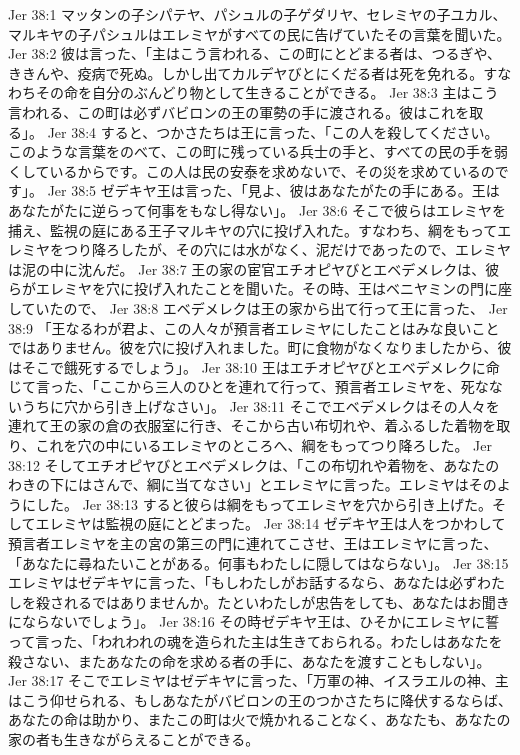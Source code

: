 Jer 38:1  マッタンの子シパテヤ、パシュルの子ゲダリヤ、セレミヤの子ユカル、マルキヤの子パシュルはエレミヤがすべての民に告げていたその言葉を聞いた。
Jer 38:2  彼は言った、「主はこう言われる、この町にとどまる者は、つるぎや、ききんや、疫病で死ぬ。しかし出てカルデヤびとにくだる者は死を免れる。すなわちその命を自分のぶんどり物として生きることができる。
Jer 38:3  主はこう言われる、この町は必ずバビロンの王の軍勢の手に渡される。彼はこれを取る」。
Jer 38:4  すると、つかさたちは王に言った、「この人を殺してください。このような言葉をのべて、この町に残っている兵士の手と、すべての民の手を弱くしているからです。この人は民の安泰を求めないで、その災を求めているのです」。
Jer 38:5  ゼデキヤ王は言った、「見よ、彼はあなたがたの手にある。王はあなたがたに逆らって何事をもなし得ない」。
Jer 38:6  そこで彼らはエレミヤを捕え、監視の庭にある王子マルキヤの穴に投げ入れた。すなわち、綱をもってエレミヤをつり降ろしたが、その穴には水がなく、泥だけであったので、エレミヤは泥の中に沈んだ。
Jer 38:7  王の家の宦官エチオピヤびとエベデメレクは、彼らがエレミヤを穴に投げ入れたことを聞いた。その時、王はベニヤミンの門に座していたので、
Jer 38:8  エベデメレクは王の家から出て行って王に言った、
Jer 38:9  「王なるわが君よ、この人々が預言者エレミヤにしたことはみな良いことではありません。彼を穴に投げ入れました。町に食物がなくなりましたから、彼はそこで餓死するでしょう」。
Jer 38:10  王はエチオピヤびとエベデメレクに命じて言った、「ここから三人のひとを連れて行って、預言者エレミヤを、死なないうちに穴から引き上げなさい」。
Jer 38:11  そこでエベデメレクはその人々を連れて王の家の倉の衣服室に行き、そこから古い布切れや、着ふるした着物を取り、これを穴の中にいるエレミヤのところへ、綱をもってつり降ろした。
Jer 38:12  そしてエチオピヤびとエベデメレクは、「この布切れや着物を、あなたのわきの下にはさんで、綱に当てなさい」とエレミヤに言った。エレミヤはそのようにした。
Jer 38:13  すると彼らは綱をもってエレミヤを穴から引き上げた。そしてエレミヤは監視の庭にとどまった。
Jer 38:14  ゼデキヤ王は人をつかわして預言者エレミヤを主の宮の第三の門に連れてこさせ、王はエレミヤに言った、「あなたに尋ねたいことがある。何事もわたしに隠してはならない」。
Jer 38:15  エレミヤはゼデキヤに言った、「もしわたしがお話するなら、あなたは必ずわたしを殺されるではありませんか。たといわたしが忠告をしても、あなたはお聞きにならないでしょう」。
Jer 38:16  その時ゼデキヤ王は、ひそかにエレミヤに誓って言った、「われわれの魂を造られた主は生きておられる。わたしはあなたを殺さない、またあなたの命を求める者の手に、あなたを渡すこともしない」。
Jer 38:17  そこでエレミヤはゼデキヤに言った、「万軍の神、イスラエルの神、主はこう仰せられる、もしあなたがバビロンの王のつかさたちに降伏するならば、あなたの命は助かり、またこの町は火で焼かれることなく、あなたも、あなたの家の者も生きながらえることができる。

